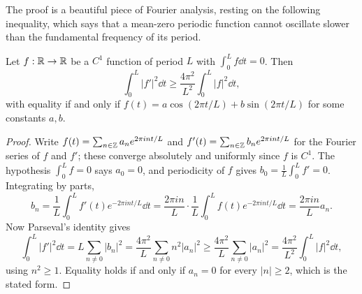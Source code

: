 \documentclass[a4paper]{scrartcl}
\begin{document}
The proof is a beautiful piece of Fourier analysis, resting on the following inequality, which says that a mean-zero periodic function cannot oscillate slower than the fundamental frequency of its period.

\begin{lemma}
    Let $f: \mathbb{R} \rightarrow \mathbb{R}$ be a $C^1$ function of period $L$ with $\int_0^{L} f \dd t = 0$. Then
    $$
    \int_0^{L} |f'|^2 \dd t \geq \frac{4\pi^2}{L^2}\int_0^{L} |f|^2 \dd t,
    $$
    with equality if and only if $f(t) = a\cos(2\pi t/L) + b \sin(2\pi t/L)$ for some constants $a, b$.
\end{lemma}
\begin{proof}
    Write $f(t) = \sum_{n \in \mathbb{Z}} a_n e^{2\pi i n t/L}$ and $f'(t) = \sum_{n\in\mathbb{Z}} b_n e^{2\pi int/L}$ for the Fourier series of $f$ and $f'$; these converge absolutely and uniformly since $f$ is $C^1$. The hypothesis $\int_0^L f = 0$ says $a_0 = 0$, and periodicity of $f$ gives $b_0 = \frac{1}{L}\int_0^L f' = 0$. Integrating by parts,
    $$
    b_n = \frac{1}{L}\int_0^L f'(t)e^{-2\pi i n t/L}\dd t = \frac{2\pi i n}{L}\cdot \frac{1}{L}\int_0^L f(t) e^{-2\pi i nt/L}\dd t = \frac{2\pi i n}{L}a_n.
    $$
    Now Parseval's identity gives
    $$
    \int_0^L |f'|^2\dd t = L\sum_{n \neq 0}|b_n|^2 = \frac{4\pi^2}{L}\sum_{n\neq 0} n^2 |a_n|^2 \geq \frac{4\pi^2}{L}\sum_{n\neq 0}|a_n|^2 = \frac{4\pi^2}{L^2}\int_0^L |f|^2 \dd t,
    $$
    using $n^2 \geq 1$. Equality holds if and only if $a_n = 0$ for every $|n| \geq 2$, which is the stated form.
\end{proof}
\end{document}
